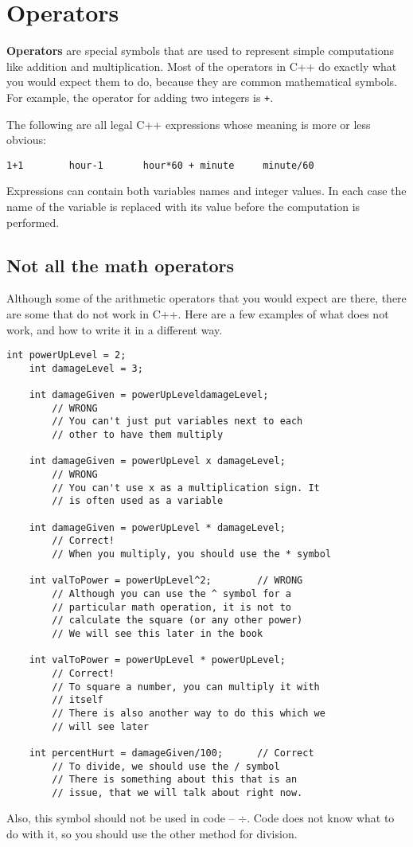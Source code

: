 \section{Operators}

{\bf Operators} are special symbols that are used to represent
simple computations like addition and multiplication.  Most
of the operators in C++ do exactly what you would expect them
to do, because they are common mathematical symbols.  For
example, the operator for adding two integers is {\tt +}.

The following are all legal C++ expressions whose meaning is
more or less obvious:

\begin{verbatim}
1+1        hour-1       hour*60 + minute     minute/60
\end{verbatim}
%
Expressions can contain both variables
names and integer values.  In each case the name of the variable is
replaced with its value before the computation is performed.


\subsection{Not all the math operators}
Although some of the arithmetic operators that you would expect are there, there are some that do not work in C++. Here are a few examples of what does not work, and how to write it in a different way.


\begin{lstlisting}[frame=single]
    int powerUpLevel = 2;
    int damageLevel = 3;
    
    int damageGiven = powerUpLeveldamageLevel;   
        // WRONG 
        // You can't just put variables next to each 
        // other to have them multiply
        
    int damageGiven = powerUpLevel x damageLevel;  
        // WRONG 
        // You can't use x as a multiplication sign. It 
        // is often used as a variable
        
    int damageGiven = powerUpLevel * damageLevel; 
        // Correct!
        // When you multiply, you should use the * symbol
    
    int valToPower = powerUpLevel^2;        // WRONG
        // Although you can use the ^ symbol for a 
        // particular math operation, it is not to 
        // calculate the square (or any other power)
        // We will see this later in the book
        
    int valToPower = powerUpLevel * powerUpLevel; 
        // Correct! 
        // To square a number, you can multiply it with
        // itself
        // There is also another way to do this which we
        // will see later
        
    int percentHurt = damageGiven/100;      // Correct
        // To divide, we should use the / symbol
        // There is something about this that is an 
        // issue, that we will talk about right now.
\end{lstlisting}
%
Also, this symbol should not be used in code -- $\div$. Code does not know what to do with it, so you should use the other method for division.


